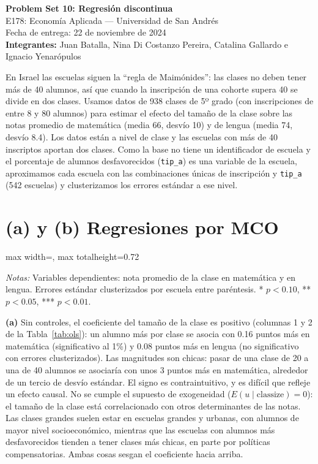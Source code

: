 \documentclass[11pt,a4paper]{article}
\newcommand{\tabla}[1]{\begin{adjustbox}{max width=\linewidth, max totalheight=0.72\textheight}\end{adjustbox}}
\newcommand{\notas}[1]{\par\vspace{0.3em}\begin{minipage}{0.92\linewidth}\footnotesize\textit{Notas:} #1\end{minipage}}
\begin{document}
\begin{center}
{\Large\bfseries Problem Set 10: Regresión discontinua}\\[0.5em]
E178: Economía Aplicada --- Universidad de San Andrés\\
Fecha de entrega: 22 de noviembre de 2024\\[0.5em]
\textbf{Integrantes:} Juan Batalla, Nina Di Costanzo Pereira, Catalina Gallardo e Ignacio Yenarópulos
\end{center}

En Israel las escuelas siguen la ``regla de Maimónides'': las clases no deben tener más de 40 alumnos, así que cuando la inscripción de una cohorte supera 40 se divide en dos clases. Usamos datos de 938 clases de 5º grado (con inscripciones de entre 8 y 80 alumnos) para estimar el efecto del tamaño de la clase sobre las notas promedio de matemática (media 66, desvío 10) y de lengua (media 74, desvío 8.4). Los datos están a nivel de clase y las escuelas con más de 40 inscriptos aportan dos clases. Como la base no tiene un identificador de escuela y el porcentaje de alumnos desfavorecidos (\texttt{tip\_a}) es una variable de la escuela, aproximamos cada escuela con las combinaciones únicas de inscripción y \texttt{tip\_a} (542 escuelas) y clusterizamos los errores estándar a ese nivel.

\section*{(a) y (b) Regresiones por MCO}

\begin{table}[H]\centering
\caption{Tamaño de la clase y notas (MCO)}\label{tab:ols}
\tabla{"../output/Tabla 1.tex"}
\notas{Variables dependientes: nota promedio de la clase en matemática y en lengua. Errores estándar clusterizados por escuela entre paréntesis. * $p<0.10$, ** $p<0.05$, *** $p<0.01$.}
\end{table}

\textbf{(a)} Sin controles, el coeficiente del tamaño de la clase es positivo (columnas 1 y 2 de la Tabla~\ref{tab:ols}): un alumno más por clase se asocia con 0.16 puntos más en matemática (significativo al 1\%) y 0.08 puntos más en lengua (no significativo con errores clusterizados). Las magnitudes son chicas: pasar de una clase de 20 a una de 40 alumnos se asociaría con unos 3 puntos más en matemática, alrededor de un tercio de desvío estándar. El signo es contraintuitivo, y es difícil que refleje un efecto causal. No se cumple el supuesto de exogeneidad ($E(u\mid \text{classize})=0$): el tamaño de la clase está correlacionado con otros determinantes de las notas. Las clases grandes suelen estar en escuelas grandes y urbanas, con alumnos de mayor nivel socioeconómico, mientras que las escuelas con alumnos más desfavorecidos tienden a tener clases más chicas, en parte por políticas compensatorias. Ambas cosas sesgan el coeficiente hacia arriba.
\end{document}
